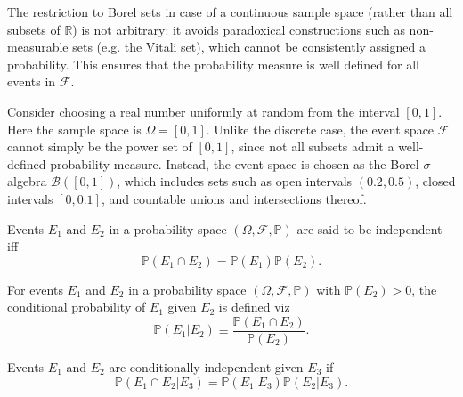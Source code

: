 \begin{remark}
	The restriction to Borel sets in case of a continuous sample space (rather than all subsets of $\mathbb{R}$) is not arbitrary: it avoids paradoxical constructions such as non-measurable sets (e.g. the Vitali set), which cannot be consistently assigned a probability. This ensures that the probability measure is well defined for all events in $\mathcal{F}$.
\end{remark}

\begin{example}
	Consider choosing a real number uniformly at random from the interval $[0,1]$. Here the sample space is $\Omega = [0,1]$. Unlike the discrete case, the event space $\mathcal{F}$ cannot simply be the power set of $[0,1]$, since not all subsets admit a well-defined probability measure. Instead, the event space is chosen as the Borel $\sigma$-algebra $\mathcal{B}([0,1])$, which includes sets such as open intervals $(0.2, 0.5)$, closed intervals $[0, 0.1]$, and countable unions and intersections thereof.
\end{example}


\begin{definition}[Independence]
	\label{def:independence}
	Events $E_1$ and $E_2$  in a probability space $(\Omega, \mathcal{F}, \mathbb{P})$ are said to be independent iff
	\begin{equation}
		\mathbb{P}(E_1 \cap E_2) = \mathbb{P}(E_1) \mathbb{P}(E_2).
		\label{eq:ind}
	\end{equation}
\end{definition}

\begin{definition}
	\label{def:conditional_probability}
	For events $E_1$ and $E_2$ in a probability space $(\Omega, \mathcal{F}, \mathbb{P})$ with $\mathbb{P}(E_2) > 0$, the conditional probability of $E_1$ given $E_2$ is defined viz
	\begin{equation}
		\mathbb{P}(E_1|E_2) \equiv \frac{\mathbb{P}(E_1 \cap E_2)}{\mathbb{P}(E_2)}.
		\label{eq:cond}
	\end{equation}
\end{definition}

\begin{definition}
\label{def:conditional_independence}
Events $E_1$ and $E_2$ are conditionally independent given $E_3$ if
\begin{equation}
\mathbb{P}(E_1 \cap E_2 | E_3) = \mathbb{P}(E_1|E_3)\mathbb{P}(E_2|E_3).
\end{equation}
\end{definition}


